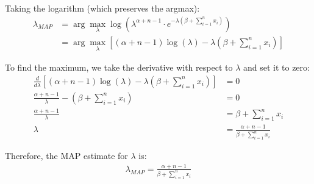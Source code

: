 \begin{itemize}
Taking the logarithm (which preserves the argmax):
\begin{align*}
\lambda_{MAP} &= \arg\max_{\lambda} \log\left(\lambda^{\alpha+n-1} \cdot e^{-\lambda(\beta + \sum_{i=1}^n x_i)}\right)\\
&= \arg\max_{\lambda} \left[ (\alpha+n-1)\log(\lambda) - \lambda\left(\beta + \sum_{i=1}^n x_i\right) \right]
\end{align*}

To find the maximum, we take the derivative with respect to $\lambda$ and set it to zero:
\begin{align*}
\frac{d}{d\lambda}\left[(\alpha+n-1)\log(\lambda) - \lambda\left(\beta + \sum_{i=1}^n x_i\right)\right] &= 0\\
\frac{\alpha+n-1}{\lambda} - \left(\beta + \sum_{i=1}^n x_i\right) &= 0\\
\frac{\alpha+n-1}{\lambda} &= \beta + \sum_{i=1}^n x_i\\
\lambda &= \frac{\alpha+n-1}{\beta + \sum_{i=1}^n x_i}
\end{align*}

Therefore, the MAP estimate for $\lambda$ is:
\begin{align*}
\lambda_{MAP} = \frac{\alpha+n-1}{\beta + \sum_{i=1}^n x_i}
\end{align*}

\end{itemize}
\newpage